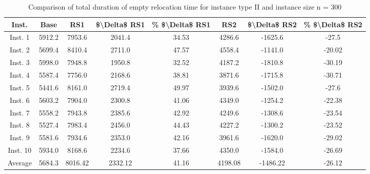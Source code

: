 \begin{table}[H]
\centering
\begin{tabular}{cccccccc}
  \hline
  \textbf{Inst.} & \textbf{Base} & \textbf{RS1} & \textbf{\$\textbackslash{}Delta\$  RS1} & \textbf{\% \$\textbackslash{}Delta\$  RS1} & \textbf{RS2} & \textbf{\$\textbackslash{}Delta\$  RS2} & \textbf{\% \$\textbackslash{}Delta\$  RS2} \\\hline
  Inst. 1 & 5912.2 & 7953.6 & 2041.4 & 34.53 & 4286.6 & -1625.6 & -27.5 \\
  Inst. 2 & 5699.4 & 8410.4 & 2711.0 & 47.57 & 4558.4 & -1141.0 & -20.02 \\
  Inst. 3 & 5998.0 & 7948.8 & 1950.8 & 32.52 & 4187.2 & -1810.8 & -30.19 \\
  Inst. 4 & 5587.4 & 7756.0 & 2168.6 & 38.81 & 3871.6 & -1715.8 & -30.71 \\
  Inst. 5 & 5441.6 & 8161.0 & 2719.4 & 49.97 & 3939.6 & -1502.0 & -27.6 \\
  Inst. 6 & 5603.2 & 7904.0 & 2300.8 & 41.06 & 4349.0 & -1254.2 & -22.38 \\
  Inst. 7 & 5558.2 & 7943.8 & 2385.6 & 42.92 & 4249.6 & -1308.6 & -23.54 \\
  Inst. 8 & 5527.4 & 7983.4 & 2456.0 & 44.43 & 4227.2 & -1300.2 & -23.52 \\
  Inst. 9 & 5581.6 & 7934.6 & 2353.0 & 42.16 & 3961.6 & -1620.0 & -29.02 \\
  Inst. 10 & 5934.0 & 8168.6 & 2234.6 & 37.66 & 4350.0 & -1584.0 & -26.69 \\
  Average & 5684.3 & 8016.42 & 2332.12 & 41.16 & 4198.08 & -1486.22 & -26.12 \\\hline
\end{tabular}
\caption{Comparison of total duration of empty relocation time for instance type II and instance size n = 300}
\label{tab:wait:resrelocation-empty-relocation-comparison_II_300}
\end{table}
